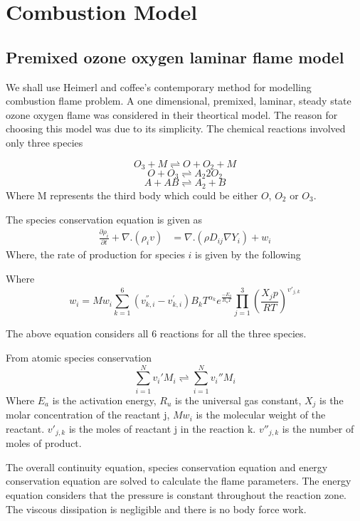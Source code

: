 \chapter{Combustion Model}
\section{Premixed ozone oxygen laminar flame model}
We shall use Heimerl and coffee's contemporary method for modelling combustion flame problem. A one dimensional, premixed, laminar, steady state ozone oxygen flame was considered in their theortical model. The reason for choosing this model was due to its simplicity. The chemical reactions involved only three species 


			$$O_3 + M \rightleftharpoons O + O_2 + M $$
			$$ O + O_3 \rightleftharpoons A_2  2O_2$$ 
			$$A + AB \rightleftharpoons A_2 + B$$
\noindent Where M represents the third body which could be either $O$, $O_2$ or $O_3$. 

\noindent The species conservation equation is given as 
\begin{eqnarray}
	\frac{\partial \rho_i}{\partial t} + \nabla . (\rho_i v) &= \nabla . (\rho D_{ij} \nabla Y_i) + w_i
\end{eqnarray}
\noindent Where, the rate of production for species $i$ is given by the following 
	
Where $$w_i = Mw_i \sum_{k=1}^{6}(v_{k,i}^{''} - v_{k,i}^{'}) B_k T^{\alpha_k} e^{\frac{-E_a}{R_u T}} \prod_{j=1}^3 \left(\frac{X_j p}{R T} \right)^{v'_{j,k}}$$

\noindent The above equation considers all 6 reactions for all the three species. 

\noindent From atomic species conservation 
	$$\sum_{i=1}^{N} v_i{'}M_i \rightleftharpoons \sum_{i=1}^{N} v_i{''}M_i $$
\noindent Where $E_a$ is the activation energy, $R_u$ is the universal gas constant, $X_j$ is the molar concentration of the reactant j, $Mw_i$ is the molecular weight of the reactant. $v'_{j,k}$ is the moles of reactant j in the reaction k. $v''_{j,k}$ is the number of moles of product. 

\bigskip

\noindent The overall continuity equation, species conservation equation and energy conservation equation are solved to calculate the flame parameters. The energy equation considers that the pressure is constant throughout the reaction zone. The viscous dissipation is negligible and there is no body force work. 

